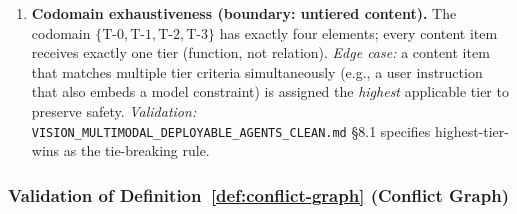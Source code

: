 \documentclass[12pt]{article}
\theoremstyle{definition}
\newcommand{\code}[1]{\texttt{#1}}
\newcommand{\VisionClean}{\code{VISION\_MULTIMODAL\_\allowbreak DEPLOYABLE\_\allowbreak AGENTS\_CLEAN.md}}
\begin{document}
\begin{enumerate}[label=\textbf{T\arabic*.}, leftmargin=*, widest=T9]
  \item \textbf{Codomain exhaustiveness (boundary: untiered
        content).}
        The codomain
        $\{\mathrm{T\text{-}0}, \mathrm{T\text{-}1},
         \mathrm{T\text{-}2}, \mathrm{T\text{-}3}\}$
        has exactly four elements; every content item receives
        exactly one tier (function, not relation).
        \emph{Edge case:} a content item that matches multiple tier
        criteria simultaneously (e.g., a user instruction that also
        embeds a model constraint) is assigned the \emph{highest}
        applicable tier to preserve safety.
        \emph{Validation:} \VisionClean{} \S8.1 specifies
        highest-tier-wins as the tie-breaking rule.

\end{enumerate}

\subsubsection{Validation of Definition~\ref{def:conflict-graph}
               (Conflict Graph)}
\label{sec:val-conflict}
\end{document}
